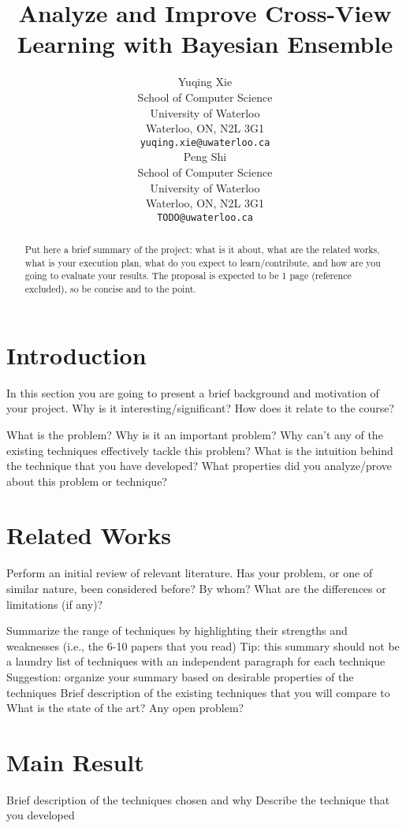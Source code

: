\documentclass{article}
\title{Analyze and Improve Cross-View Learning with Bayesian Ensemble}
\author{
	Yuqing Xie \\
	School of Computer Science\\
	University of Waterloo\\
	Waterloo, ON, N2L 3G1 \\
	\texttt{yuqing.xie@uwaterloo.ca} \\
	\And
	Peng Shi\\
	School of Computer Science\\
	University of Waterloo\\
	Waterloo, ON, N2L 3G1 \\
	\texttt{TODO@uwaterloo.ca} \\
}
\begin{document}
\maketitle

\begin{abstract} 
Put here a brief summary of the project: what is it about, what are the related works, what is your execution plan, what do you expect to learn/contribute, and how are you going to evaluate your results. The proposal is expected to be 1 page (reference excluded), so be concise and to the point.
\end{abstract} 

\section{Introduction}
In this section you are going to present a brief background and motivation of your project. Why is it interesting/significant? How does it relate to the course?

What is the problem?
Why is it an important problem?
Why can't any of the existing techniques effectively tackle this problem?
What is the intuition behind the technique that you have developed?
What properties did you analyze/prove about this problem or technique?

\section{Related Works}
Perform an initial review of relevant literature. Has your problem, or one of similar nature, been considered before? By whom? What are the differences or limitations (if any)? 

Summarize the range of techniques by highlighting their strengths and weaknesses (i.e., the 6-10 papers that you read)
Tip: this summary should not be a laundry list of techniques with an independent paragraph for each technique
Suggestion: organize your summary based on desirable properties of the techniques
Brief description of the existing techniques that you will compare to
What is the state of the art?
Any open problem?
\section{Main Result}
Brief description of the techniques chosen and why
Describe the technique that you developed
\end{document}
